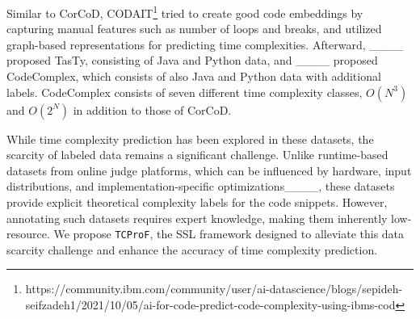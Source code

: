 Similar to CorCoD,
CODAIT\footnote{https://community.ibm.com/community/user/ai-datascience/blogs/sepideh-seifzadeh1/2021/10/05/ai-for-code-predict-code-complexity-using-ibms-cod}
tried to create good code embeddings by capturing manual features such 
as number of loops and breaks, and utilized graph-based representations
for predicting time complexities.
Afterward, ____ proposed TasTy, consisting of Java and Python data, and ____
proposed CodeComplex, which consists of also Java and Python data with additional labels.
CodeComplex consists of seven different time complexity classes,
$O(N^3)$ and $O(2^N)$ in addition to those of CorCoD.

While time complexity prediction has been explored in these datasets,
the scarcity of labeled data remains a significant challenge.
Unlike runtime-based datasets from online judge platforms,
which can be influenced by hardware, input distributions,
and implementation-specific optimizations____,
these datasets provide explicit theoretical complexity labels for the code snippets.
However, annotating such datasets requires expert knowledge, making them inherently low-resource.
We propose \texttt{TCProF}, the SSL framework designed to
alleviate this data scarcity challenge and enhance the accuracy of time complexity prediction.